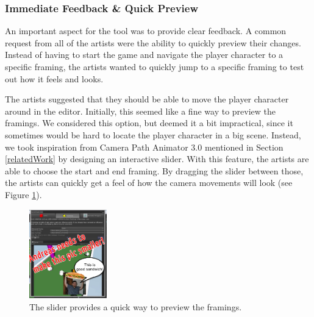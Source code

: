 
\subsubsection{Immediate Feedback \& Quick Preview}
An important aspect for the tool was to provide clear feedback. A common request from all of the artists were the ability to quickly preview their changes. Instead of having to start the game and navigate the player character to a specific framing, the artists wanted to quickly jump to a specific framing to test out how it feels and looks.

The artists suggested that they should be able to move the player character around in the editor. Initially, this seemed like a fine way to preview the framings. We considered this option, but deemed it a bit impractical, since it sometimes would be hard to locate the player character in a big scene. Instead, we took inspiration from Camera Path Animator 3.0 mentioned in Section \ref{relatedWork} by designing an interactive slider. With this feature, the artists are able to choose the start and end framing. By dragging the slider between those, the artists can quickly get a feel of how the camera movements will look (see Figure \ref{fig:slider}).

\begin{figure}[htbp]
\centering
\includegraphics[width=0.3\textwidth]{Pics/slider}
\caption{The slider provides a quick way to preview the framings.}
\label{fig:slider}
\end{figure}